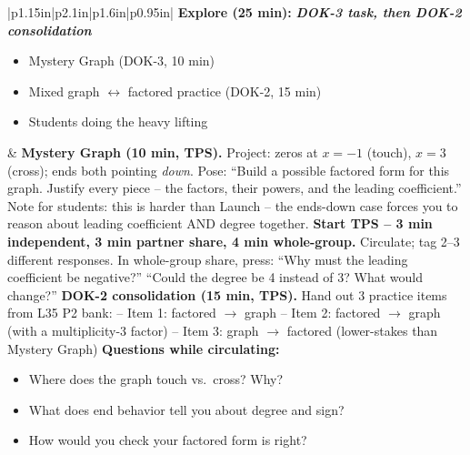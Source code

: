 \documentclass[11pt]{article}
\begin{document}
\begin{xltabular}{\textwidth}{|p{1.15in}|p{2.1in}|p{1.6in}|p{0.95in}|}
\textbf{Explore (25 min):} \newline \textbf{\textit{DOK-3 task, then DOK-2 consolidation}}
\begin{itemize}[label=$\bullet$, leftmargin=*, nosep]
    \item Mystery Graph (DOK-3, 10 min)
    \item Mixed graph $\leftrightarrow$ factored practice (DOK-2, 15 min)
    \item Students doing the heavy lifting
\end{itemize} &
\textbf{Mystery Graph (10 min, TPS).} Project: zeros at $x=-1$ (touch), $x=3$ (cross); ends both pointing \emph{down}. \newline\newline
Pose: ``Build a possible factored form for this graph. Justify every piece -- the factors, their powers, and the leading coefficient.'' Note for students: this is harder than Launch -- the ends-down case forces you to reason about leading coefficient AND degree together. \newline\newline
\textbf{Start TPS -- 3 min independent, 3 min partner share, 4 min whole-group.} \newline\newline
Circulate; tag 2--3 different responses. In whole-group share, press: ``Why must the leading coefficient be negative?'' ``Could the degree be 4 instead of 3? What would change?'' \newline\newline
\textbf{DOK-2 consolidation (15 min, TPS).} Hand out 3 practice items from L35 P2 bank: \newline
-- Item 1: factored $\rightarrow$ graph \newline
-- Item 2: factored $\rightarrow$ graph (with a multiplicity-3 factor) \newline
-- Item 3: graph $\rightarrow$ factored (lower-stakes than Mystery Graph) \newline\newline
\textbf{Questions while circulating:}
\begin{itemize}[label=$\bullet$, leftmargin=*, nosep]
    \item Where does the graph touch vs.\ cross? Why?
    \item What does end behavior tell you about degree and sign?
    \item How would you check your factored form is right?
\end{itemize}

\end{xltabular}
\end{document}
